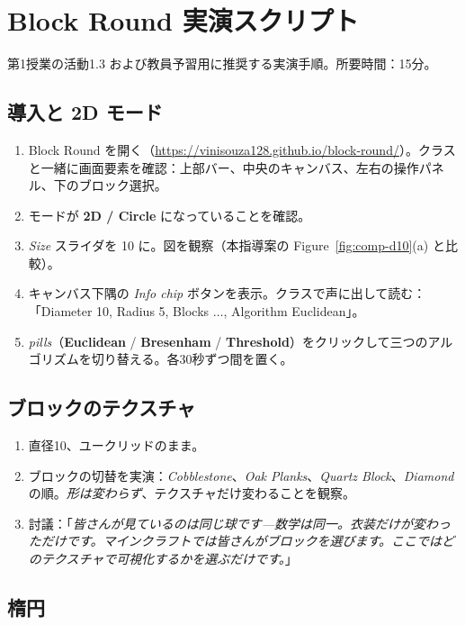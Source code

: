 \documentclass[12pt,a4paper]{scrartcl}
\newcommand{\acc}[1]{\textcolor{accent}{\textbf{#1}}}
\begin{document}
\section{Block Round 実演スクリプト}\label{ap:roteiro}

第1授業の活動1.3 および教員予習用に推奨する実演手順。所要時間：15分。

\subsection{導入と 2D モード}
\begin{enumerate}[leftmargin=1.5em,itemsep=0.15em,topsep=0.3em]
  \item Block Round を開く（\url{https://vinisouza128.github.io/block-round/}）。クラスと一緒に画面要素を確認：上部バー、中央のキャンバス、左右の操作パネル、下のブロック選択。
  \item モードが \acc{2D / Circle} になっていることを確認。
  \item \emph{Size} スライダを 10 に。図を観察（本指導案の Figure~\ref{fig:comp-d10}(a) と比較）。
  \item キャンバス下隅の \emph{Info chip} ボタンを表示。クラスで声に出して読む：「Diameter 10, Radius 5, Blocks $\dots$, Algorithm Euclidean」。
  \item \emph{pills}（\acc{Euclidean} / \acc{Bresenham} / \acc{Threshold}）をクリックして三つのアルゴリズムを切り替える。各30秒ずつ間を置く。
\end{enumerate}

\subsection{ブロックのテクスチャ}

\begin{enumerate}[leftmargin=1.5em,itemsep=0.15em,topsep=0.3em]
  \item 直径10、ユークリッドのまま。
  \item ブロックの切替を実演：\emph{Cobblestone}、\emph{Oak Planks}、\emph{Quartz Block}、\emph{Diamond} の順。\emph{形は変わらず}、テクスチャだけ変わることを観察。
  \item 討議：「\emph{皆さんが見ているのは同じ球です---数学は同一。衣装だけが変わっただけです。マインクラフトでは皆さんがブロックを選びます。ここではどのテクスチャで可視化するかを選ぶだけです。}」
\end{enumerate}

\subsection{楕円}
\end{document}
